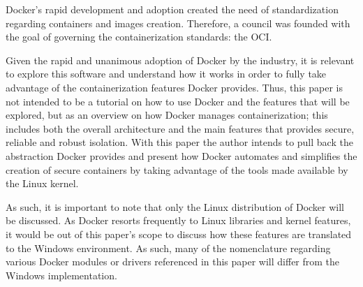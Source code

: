 Docker's rapid development and adoption created the need of standardization regarding containers and images creation. Therefore, a council was founded with the goal of governing the containerization standards: the \ac{OCI}.

Given the rapid and unanimous adoption of Docker by the industry, it is relevant to explore this software and understand how it works in order to fully take advantage of the containerization features Docker provides. Thus, this paper is not intended to be a tutorial on how to use Docker and the features that will be explored, but as an overview on how Docker manages containerization; this includes both the overall architecture and the main features that provides secure, reliable and robust isolation. With this paper the author intends to pull back the abstraction Docker provides and present how Docker automates and simplifies the creation of secure containers by taking advantage of the tools made available by the Linux kernel. 

As such, it is important to note that only the Linux distribution of Docker will be discussed. As Docker resorts frequently to Linux libraries and kernel features, it would be out of this paper's scope to discuss how these features are translated to the Windows environment. As such, many of the nomenclature regarding various Docker modules or drivers referenced in this paper will differ from the Windows implementation.